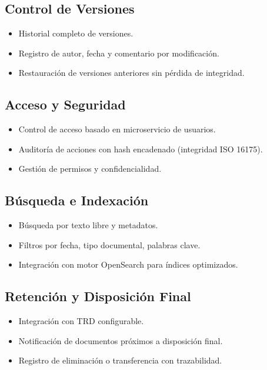 \documentclass[12pt,a4paper]{article}
\begin{document}
\subsection{Control de Versiones}
\begin{itemize}
    \item Historial completo de versiones.
    \item Registro de autor, fecha y comentario por modificación.
    \item Restauración de versiones anteriores sin pérdida de integridad.
\end{itemize}

\subsection{Acceso y Seguridad}
\begin{itemize}
    \item Control de acceso basado en microservicio de usuarios.
    \item Auditoría de acciones con hash encadenado (integridad ISO 16175).
    \item Gestión de permisos y confidencialidad.
\end{itemize}

\subsection{Búsqueda e Indexación}
\begin{itemize}
    \item Búsqueda por texto libre y metadatos.
    \item Filtros por fecha, tipo documental, palabras clave.
    \item Integración con motor OpenSearch para índices optimizados.
\end{itemize}

\subsection{Retención y Disposición Final}
\begin{itemize}
    \item Integración con TRD configurable.
    \item Notificación de documentos próximos a disposición final.
    \item Registro de eliminación o transferencia con trazabilidad.
\end{itemize}
\end{document}
